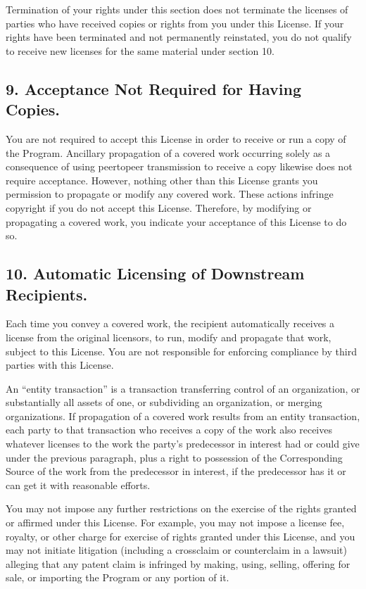 \documentclass[letterpaper,10pt,english]{sphinxmanual}
\begin{document}
\sphinxAtStartPar
Termination of your rights under this section does not terminate the
licenses of parties who have received copies or rights from you under
this License.  If your rights have been terminated and not permanently
reinstated, you do not qualify to receive new licenses for the same
material under section 10.


\subsection{9. Acceptance Not Required for Having Copies.}
\label{\detokenize{license:acceptance-not-required-for-having-copies}}
\sphinxAtStartPar
You are not required to accept this License in order to receive or
run a copy of the Program.  Ancillary propagation of a covered work
occurring solely as a consequence of using peer\sphinxhyphen{}to\sphinxhyphen{}peer transmission
to receive a copy likewise does not require acceptance.  However,
nothing other than this License grants you permission to propagate or
modify any covered work.  These actions infringe copyright if you do
not accept this License.  Therefore, by modifying or propagating a
covered work, you indicate your acceptance of this License to do so.


\subsection{10. Automatic Licensing of Downstream Recipients.}
\label{\detokenize{license:automatic-licensing-of-downstream-recipients}}
\sphinxAtStartPar
Each time you convey a covered work, the recipient automatically
receives a license from the original licensors, to run, modify and
propagate that work, subject to this License.  You are not responsible
for enforcing compliance by third parties with this License.

\sphinxAtStartPar
An “entity transaction” is a transaction transferring control of an
organization, or substantially all assets of one, or subdividing an
organization, or merging organizations.  If propagation of a covered
work results from an entity transaction, each party to that
transaction who receives a copy of the work also receives whatever
licenses to the work the party’s predecessor in interest had or could
give under the previous paragraph, plus a right to possession of the
Corresponding Source of the work from the predecessor in interest, if
the predecessor has it or can get it with reasonable efforts.

\sphinxAtStartPar
You may not impose any further restrictions on the exercise of the
rights granted or affirmed under this License.  For example, you may
not impose a license fee, royalty, or other charge for exercise of
rights granted under this License, and you may not initiate litigation
(including a cross\sphinxhyphen{}claim or counterclaim in a lawsuit) alleging that
any patent claim is infringed by making, using, selling, offering for
sale, or importing the Program or any portion of it.
\end{document}
